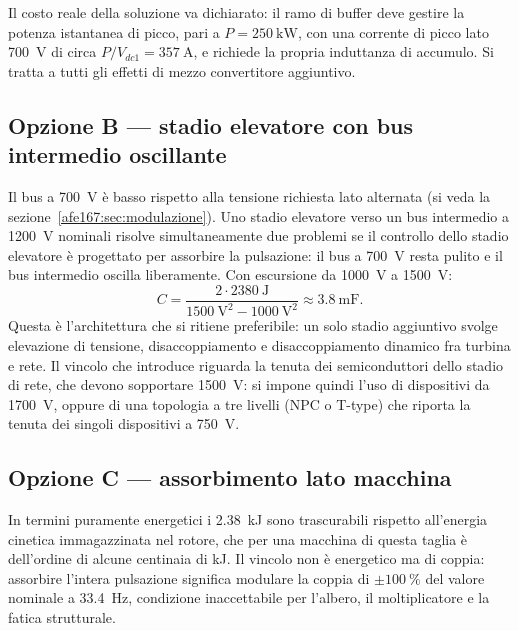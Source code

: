 Il costo reale della soluzione va dichiarato: il ramo di buffer deve gestire la potenza
istantanea di picco, pari a $P=\SI{250}{\kilo\watt}$, con una corrente di picco lato
\SI{700}{\volt} di circa $P/V_{dc1}=\SI{357}{\ampere}$, e richiede la propria induttanza
di accumulo. Si tratta a tutti gli effetti di mezzo convertitore aggiuntivo.

\subsection{Opzione B --- stadio elevatore con bus intermedio oscillante}

Il bus a \SI{700}{\volt} è basso rispetto alla tensione richiesta lato alternata (si veda
la sezione~\ref{afe167:sec:modulazione}). Uno stadio elevatore verso un bus intermedio a
\SI{1200}{\volt} nominali risolve simultaneamente due problemi se il controllo dello
stadio elevatore è progettato per assorbire la pulsazione: il bus a \SI{700}{\volt} resta
pulito e il bus intermedio oscilla liberamente. Con escursione da \SI{1000}{\volt} a
\SI{1500}{\volt}:
\begin{equation}
C = \frac{2\cdot\SI{2380}{\joule}}{\SI{1500}{\volt}^2-\SI{1000}{\volt}^2}
\approx \SI{3.8}{\milli\farad}.
\end{equation}
Questa è l'architettura che si ritiene preferibile: un solo stadio aggiuntivo svolge
elevazione di tensione, disaccoppiamento e disaccoppiamento dinamico fra turbina e rete.
Il vincolo che introduce riguarda la tenuta dei semiconduttori dello stadio di rete, che
devono sopportare \SI{1500}{\volt}: si impone quindi l'uso di dispositivi da
\SI{1700}{\volt}, oppure di una topologia a tre livelli (NPC o T-type) che riporta la
tenuta dei singoli dispositivi a \SI{750}{\volt}.

\subsection{Opzione C --- assorbimento lato macchina}

In termini puramente energetici i \SI{2.38}{\kilo\joule} sono trascurabili rispetto
all'energia cinetica immagazzinata nel rotore, che per una macchina di questa taglia è
dell'ordine di alcune centinaia di \si{\kilo\joule}. Il vincolo non è energetico ma di
coppia: assorbire l'intera pulsazione significa modulare la coppia di
$\pm\SI{100}{\percent}$ del valore nominale a \SI{33.4}{\hertz}, condizione inaccettabile
per l'albero, il moltiplicatore e la fatica strutturale.

